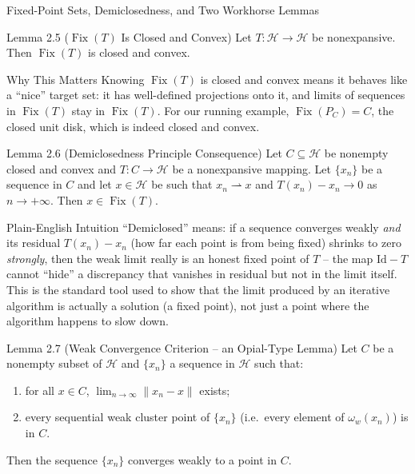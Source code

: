 \documentclass[aspectratio=169,10pt]{beamer}
\DeclareMathOperator{\Fix}{Fix}
\newcommand{\Id}{\mathrm{Id}}
\newcommand{\wto}{\rightharpoonup}
\begin{document}
\begin{frame}[allowframebreaks]{Fixed-Point Sets, Demiclosedness, and Two Workhorse Lemmas}

  \begin{block}{Lemma 2.5 ($\Fix(T)$ Is Closed and Convex)}
    Let $T : \mathcal{H} \to \mathcal{H}$ be nonexpansive. Then $\Fix(T)$ is
    closed and convex.
  \end{block}

  \begin{block}{Why This Matters}
    Knowing $\Fix(T)$ is closed and convex means it behaves like a
    ``nice'' target set: it has well-defined projections onto it, and limits
    of sequences in $\Fix(T)$ stay in $\Fix(T)$. For our running example,
    $\Fix(P_C) = C$, the closed unit disk, which is indeed closed and convex.
  \end{block}

  \begin{block}{Lemma 2.6 (Demiclosedness Principle Consequence)}
    Let $C \subseteq \mathcal{H}$ be nonempty closed and convex and
    $T : C \to \mathcal{H}$ be a nonexpansive mapping. Let $\{x_n\}$ be a
    sequence in $C$ and let $x \in \mathcal{H}$ be such that $x_n \wto x$ and
    $T(x_n) - x_n \to 0$ as $n \to +\infty$. Then $x \in \Fix(T)$.
  \end{block}

  \begin{block}{Plain-English Intuition}
    ``Demiclosed'' means: if a sequence converges weakly \emph{and} its
    residual $T(x_n)-x_n$ (how far each point is from being fixed) shrinks to
    zero \emph{strongly}, then the weak limit really is an honest fixed point
    of $T$ -- the map $\Id - T$ cannot ``hide'' a discrepancy that vanishes in
    residual but not in the limit itself. This is the standard tool used to
    show that the limit produced by an iterative algorithm is actually a
    solution (a fixed point), not just a point where the algorithm happens to
    slow down.
  \end{block}

  \framebreak

  \begin{block}{Lemma 2.7 (Weak Convergence Criterion -- an Opial-Type Lemma)}
    Let $C$ be a nonempty subset of $\mathcal{H}$ and $\{x_n\}$ a sequence in
    $\mathcal{H}$ such that:
    \begin{enumerate}
      \item[(a)] for all $x \in C$, $\lim_{n\to\infty}\|x_n - x\|$ exists;
      \item[(b)] every sequential weak cluster point of $\{x_n\}$ (i.e.\
        every element of $\omega_w(x_n)$) is in $C$.
    \end{enumerate}
    Then the sequence $\{x_n\}$ converges weakly to a point in $C$.
  \end{block}


\end{frame}
\end{document}
